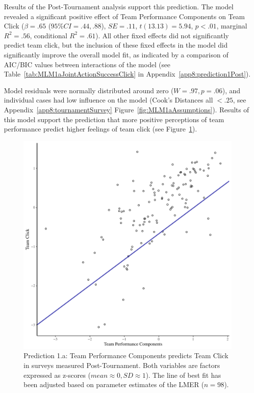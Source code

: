 \begin{CJK}{UTF8}{gbsn}
Results of the Post-Tournament analysis support this prediction. The model revealed a significant positive effect of Team Performance Components on Team Click ($\beta = .65$ ($95\% CI = .44, .88$), $SE = .11$, $t(13.13) = 5.94$, $p < .01$, marginal $R^2 = .56$, conditional $R^2 = .61$).  All other fixed effects did not significantly predict team click, but the inclusion of these fixed effects in the model did significantly improve the overall model fit, as indicated by a comparison of AIC/BIC values between interactions of the model (see Table~\ref{tab:MLM1aJointActionSuccessClick} in Appendix~\ref{app8:prediction1Post}).

Model residuals were normally distributed around zero ($W = .97, p = .06$), and individual cases had low influence on the model (Cook's Distances all $< .25$, see Appendix~\ref{app8:tournamentSurvey} Figure~\ref{fig:MLM1aAssumptions}). Results of this model support the prediction that more positive perceptions of team performance predict higher feelings of team click (see Figure~\ref{fig:jasClickModelSLope}).

\begin{figure}[htbp]
  \centering
\includegraphics[scale = .5]{images/jasClickModelSlope}
  \caption{Prediction 1.a: Team Performance Components predicts Team Click in surveys measured Post-Tournament.  Both variables are factors expressed as z-scores ($mean \approx 0, SD \approx 1$).  The line of best fit has been adjusted based on parameter estimates of the LMER ($n = 98$).}
  \label{fig:jasClickModelSLope}
\end{figure}




\end{CJK}
